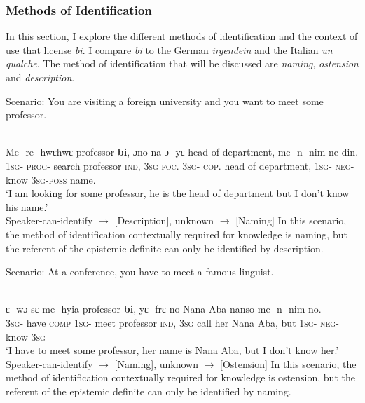 \documentclass[output=paper,modfonts,nonflat,draftmode]{langsci/langscibook}
\begin{document}
\subsubsection{Methods of Identification}
In this section, I explore the different methods of identification and the context of use that license \emph{bi}. I compare \emph{bi} to the German \emph{irgendein} and the Italian \emph{un qualche}. The method of identification that will be discussed are \emph{naming}, \emph{ostension} and \emph{description}.


Scenario: You are visiting a foreign university and you want to meet some professor.

\ea\label{owusu:ex45a}\\
\gll Me- re- hwεhwε professor \textbf{bi}, ɔno na ɔ- yε head of department, me- n- nim ne din.\\
\textsc{1sg}- \textsc{prog}- search professor \textsc{ind}, \textsc{3sg} \textsc{foc}. \textsc{3sg}- \textsc{cop}. head of department, \textsc{1sg}- \textsc{neg}- know \textsc{3sg}-\textsc{poss} name.\\
\glt `I am looking for some professor, he is the head of department but I don't know his name.'\\
	Speaker-can-identify $\rightarrow$ [Description], unknown $\rightarrow$  [Naming]
 \z  In this scenario, the method of identification contextually required for knowledge is naming, but the referent of the epistemic definite can only be identified by description.
 
Scenario: At a conference, you have to meet a famous linguist.

\ea\label{owusu:ex45b}\\
\gll ε- wɔ  sε me- hyia professor \textbf{bi}, yε- frε no Nana Aba nanso me- n- nim no.\\
\textsc{3sg}- have \textsc{comp} \textsc{1sg}- meet professor \textsc{ind}, \textsc{3sg} call her Nana Aba, but \textsc{1sg}- \textsc{neg}- know \textsc{3sg}\\
\glt `I have to meet some professor, her name is Nana Aba, but I don't know her.'\\
	Speaker-can-identify $\rightarrow$ [Naming], unknown $\rightarrow$  [Ostension]
 \z In this scenario, the method of identification contextually required for knowledge is ostension, but the referent of the epistemic definite can only be identified by naming.
\end{document}
